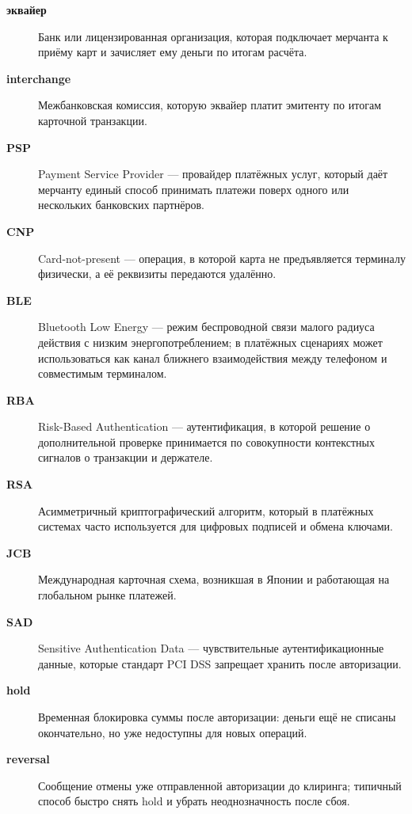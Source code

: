 \begin{description}
  \item[\textbf{эквайер}] Банк или лицензированная организация, которая подключает мерчанта к приёму карт и зачисляет ему деньги по итогам расчёта.

  \item[\textbf{interchange}] Межбанковская комиссия, которую эквайер платит эмитенту по итогам карточной транзакции.

  \item[\textbf{PSP}] Payment Service Provider — провайдер платёжных услуг, который даёт мерчанту единый способ принимать платежи поверх одного или нескольких банковских партнёров.

  \item[\textbf{CNP}] Card-not-present — операция, в которой карта не предъявляется терминалу физически, а её реквизиты передаются удалённо.

  \item[\textbf{BLE}] Bluetooth Low Energy — режим беспроводной связи малого радиуса действия с низким энергопотреблением; в платёжных сценариях может использоваться как канал ближнего взаимодействия между телефоном и совместимым терминалом.

  \item[\textbf{RBA}] Risk-Based Authentication — аутентификация, в которой решение о дополнительной проверке принимается по совокупности контекстных сигналов о транзакции и держателе.

  \item[\textbf{RSA}] Асимметричный криптографический алгоритм, который в платёжных системах часто используется для цифровых подписей и обмена ключами.

  \item[\textbf{JCB}] Международная карточная схема, возникшая в Японии и работающая на глобальном рынке платежей.

  \item[\textbf{SAD}] Sensitive Authentication Data — чувствительные аутентификационные данные, которые стандарт PCI DSS запрещает хранить после авторизации.

  \item[\textbf{hold}] Временная блокировка суммы после авторизации: деньги ещё не списаны окончательно, но уже недоступны для новых операций.

  \item[\textbf{reversal}] Сообщение отмены уже отправленной авторизации до клиринга; типичный способ быстро снять hold и убрать неоднозначность после сбоя.


\end{description}
